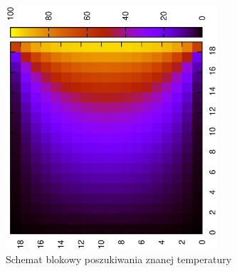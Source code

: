 \documentclass[11pt,a4paper]{article}
\begin{document}
\begin{figure}[H]
\begin{center}
\includegraphics[width=0.7\textwidth,angle=-90]{grid.eps}
\caption{Schemat blokowy poszukiwania znanej temperatury}
\end{center}
\end{figure}
\end{document}

